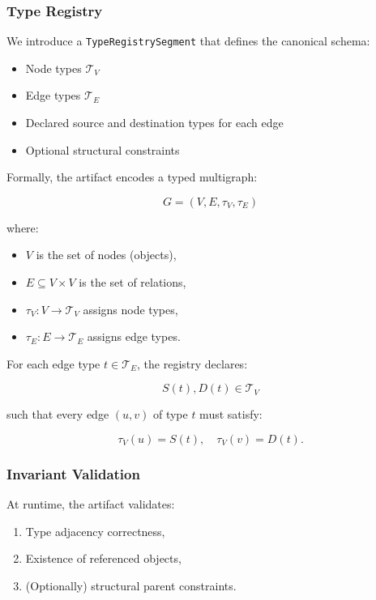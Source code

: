 \documentclass[11pt]{article}
\begin{document}
\subsubsection{Type Registry}

We introduce a \texttt{TypeRegistrySegment} that defines the canonical schema:

\begin{itemize}
    \item Node types $\mathcal{T}_V$
    \item Edge types $\mathcal{T}_E$
    \item Declared source and destination types for each edge
    \item Optional structural constraints
\end{itemize}

Formally, the artifact encodes a typed multigraph:

\[
G = (V, E, \tau_V, \tau_E)
\]

where:
\begin{itemize}
    \item $V$ is the set of nodes (objects),
    \item $E \subseteq V \times V$ is the set of relations,
    \item $\tau_V : V \to \mathcal{T}_V$ assigns node types,
    \item $\tau_E : E \to \mathcal{T}_E$ assigns edge types.
\end{itemize}

For each edge type $t \in \mathcal{T}_E$, the registry declares:

\[
S(t), D(t) \in \mathcal{T}_V
\]

such that every edge $(u,v)$ of type $t$ must satisfy:

\[
\tau_V(u) = S(t), \quad \tau_V(v) = D(t).
\]

\subsubsection{Invariant Validation}

At runtime, the artifact validates:

\begin{enumerate}
    \item Type adjacency correctness,
    \item Existence of referenced objects,
    \item (Optionally) structural parent constraints.
\end{enumerate}
\end{document}
